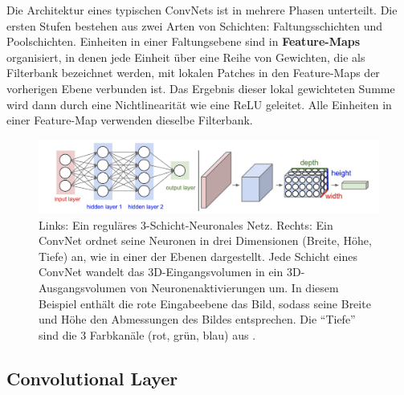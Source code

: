     Die Architektur eines typischen ConvNets ist in mehrere Phasen unterteilt. Die ersten Stufen bestehen aus zwei Arten von Schichten: Faltungsschichten und Poolschichten. Einheiten in einer Faltungsebene sind in \textbf{Feature-Maps} organisiert, in denen jede Einheit über eine Reihe von Gewichten, die als Filterbank bezeichnet werden, mit lokalen Patches in den Feature-Maps der vorherigen Ebene verbunden ist. Das Ergebnis dieser lokal gewichteten Summe wird dann durch eine Nichtlinearität wie \zb eine ReLU geleitet. Alle Einheiten in einer Feature-Map verwenden dieselbe Filterbank\cite*{Lecun2015}.


    \begin{figure}[H]
        \centering
        \includegraphics[width=13cm]{kapitel2/conv.png}
        \caption[Vergleich eines NN mit einem CNN]{Links: Ein reguläres 3-Schicht-Neuronales Netz. Rechts: Ein ConvNet ordnet seine Neuronen in drei Dimensionen (Breite, Höhe, Tiefe) an, wie in einer der Ebenen dargestellt. Jede Schicht eines ConvNet wandelt das 3D-Eingangsvolumen in ein 3D-Ausgangsvolumen von Neuronenaktivierungen um. In diesem Beispiel enthält die rote Eingabeebene das Bild, sodass seine Breite und Höhe den Abmessungen des Bildes entsprechen. Die \enquote{Tiefe} sind die 3 Farbkanäle (rot, grün, blau) aus \cite*{StanfordUniversityCoursecs231n2018a}.}
        \label{Kap2:Conv}
    \end{figure}


    \subsection{Convolutional Layer}

